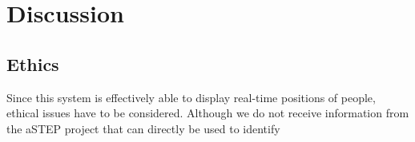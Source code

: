 \chapter{Discussion}


\section{Ethics}
Since this system is effectively able to display real-time positions of people, ethical issues have to be considered. Although we do not receive information from the aSTEP project that can directly be used to identify


